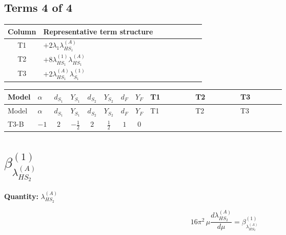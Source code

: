 \documentclass[8pt]{article}
\begin{document}
\begin{landscape}
\subsection*{Terms 4 of 4}
\begin{center}
\begin{tabular}{@{}c >{\raggedright\arraybackslash}p{0.82\linewidth}@{}}
\toprule
Column & Representative term structure \\
\midrule
T1 & \(\displaystyle +2 {\lambda_1} {\lambda_{HS_1}^{(A)}}\) \\
\midrule
T2 & \(\displaystyle +8 {\lambda_{HS_1}^{(1)}} {\lambda_{HS_1}^{(A)}}\) \\
\midrule
T3 & \(\displaystyle +2 {\lambda_{HS_1}^{(A)}} {\lambda_{S_1}^{(1)}}\) \\
\midrule
\bottomrule
\end{tabular}
\end{center}
\smallskip
\tiny
\begin{longtable}{@{}llcccccc >{\raggedright\arraybackslash}p{0.21\linewidth} >{\raggedright\arraybackslash}p{0.21\linewidth} >{\raggedright\arraybackslash}p{0.21\linewidth}@{}}
\toprule
Model & $\alpha$ & $d_{S_1}$ & $Y_{S_1}$ & $d_{S_2}$ & $Y_{S_2}$ & $d_F$ & $Y_F$ & T1 & T2 & T3 \\
\midrule
\endfirsthead
\toprule
Model & $\alpha$ & $d_{S_1}$ & $Y_{S_1}$ & $d_{S_2}$ & $Y_{S_2}$ & $d_F$ & $Y_F$ & T1 & T2 & T3 \\
\midrule
\endhead
T3-B & $-1$ & $2$ & $-\frac{1}{2}$ & $2$ & $\frac{1}{2}$ & $1$ & $0$ & \scriptsize\adjustbox{max width=\linewidth}{$\begin{gathered} +2 {\lambda_1} {\lambda_{HS_1}^{(A)}}\end{gathered}$} & \scriptsize\adjustbox{max width=\linewidth}{$\begin{gathered} +8 {\lambda_{HS_1}^{(1)}} {\lambda_{HS_1}^{(A)}}\end{gathered}$} & \scriptsize\adjustbox{max width=\linewidth}{$\begin{gathered} +2 {\lambda_{HS_1}^{(A)}} {\lambda_{S_1}^{(1)}}\end{gathered}$} \\
\midrule
\bottomrule
\end{longtable}
\clearpage
\section*{$\beta_{\lambda_{HS_2}^{(A)}}^{(1)}$}
\noindent\textbf{Quantity: }$\lambda_{HS_2}^{(A)}$\par\smallskip
\[16\pi^2\,\mu\frac{d \lambda_{HS_2}^{(A)}}{d\mu}=\beta_{\lambda_{HS_2}^{(A)}}^{(1)}\]

\end{landscape}
\end{document}
